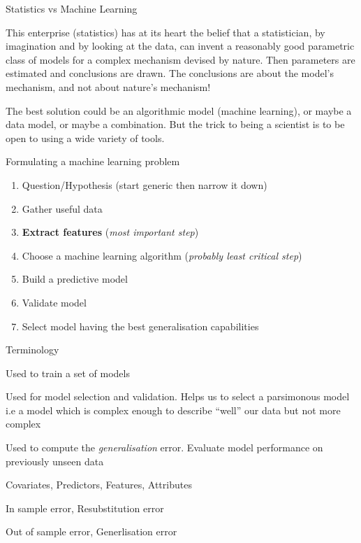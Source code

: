 \documentclass[pdf]{beamer}
\begin{document}
\begin{frame}{Statistics vs Machine Learning}
\begin{exampleblock}{}
{\small This enterprise (statistics) has at its heart the belief that a statistician, by imagination and by looking at the data, can invent a reasonably good parametric class of models for a complex mechanism devised by nature. Then parameters are estimated and conclusions are drawn. The conclusions are about the model's mechanism, and not about nature's mechanism!}
\vskip5mm
\hspace*{}
\end{exampleblock}
\vfill
\begin{exampleblock}{}
{\small The best solution could be an algorithmic model (machine learning), or maybe a data model, or maybe a combination. But the trick to being a scientist is to be open to using a wide variety of tools.}
\vskip5mm
\hspace*{}
\end{exampleblock}
\end{frame}
\begin{frame}{Formulating a machine learning problem}
\begin{enumerate}\addtolength{\itemsep}{0.5\baselineskip}
	\item<2-> Question/Hypothesis (start generic then narrow it down)
	\item<3-> Gather useful data
	\item<4-> \textbf{Extract features} (\textit{most important step})
	\item<5-> Choose a machine learning algorithm (\textit{probably least critical step})
	\item<6-> Build a predictive model
	\item<7-> Validate model
	\item<8-> Select model having the best generalisation capabilities
\end{enumerate}
\end{frame}
\begin{frame}{Terminology}
\begin{description}\addtolength{\itemsep}{0.5\baselineskip}
	\item<2->[Training Dataset:] Used to train a set of models
	\item<3->[Validation Dataset:] Used for model selection and validation. Helps us to select a 
	parsimonous model i.e a model which is complex enough to describe ``well'' our data but not more 
	complex
	\item<4->[Testing Dataset:] Used to compute the \textit{generalisation} error. Evaluate model
	performance on previously unseen data 
	\item<5->[Inputs:] Covariates, Predictors, Features, Attributes
	\item<6->[Training error:] In sample error, Resubstitution error
	\item<7->[Testing error:] Out of sample error, Generlisation error
\end{description}
\end{frame}
\end{document}
